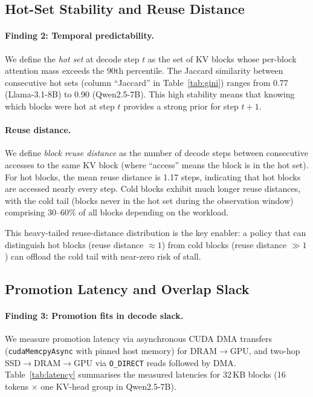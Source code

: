 \documentclass[acmsmall,nonacm,screen]{acmart}
\begin{document}
\subsection{Hot-Set Stability and Reuse Distance}\label{sec:meas:reuse}

\paragraph{Finding 2: Temporal predictability.}
We define the \emph{hot set} at decode step $t$ as the set of KV blocks
whose per-block attention mass exceeds the 90th percentile.  The Jaccard
similarity between consecutive hot sets (column ``Jaccard'' in
Table~\ref{tab:gini}) ranges from 0.77 (Llama-3.1-8B) to 0.90 (Qwen2.5-7B).
This high stability means that knowing which blocks were hot at step $t$
provides a strong prior for step $t{+}1$.

\paragraph{Reuse distance.}
We define \emph{block reuse distance} as the number of decode steps between
consecutive accesses to the same KV block (where ``access'' means the block
is in the hot set).  For hot blocks, the mean reuse distance is 1.17 steps,
indicating that hot blocks are accessed nearly every step.  Cold blocks
exhibit much longer reuse distances, with the cold tail (blocks never in the
hot set during the observation window) comprising 30--60\% of all blocks
depending on the workload.

This heavy-tailed reuse-distance distribution is the key enabler: a policy
that can distinguish hot blocks (reuse distance $\approx 1$) from cold
blocks (reuse distance $\gg 1$) can offload the cold tail with near-zero
risk of stall.

\subsection{Promotion Latency and Overlap Slack}\label{sec:meas:slack}

\paragraph{Finding 3: Promotion fits in decode slack.}
We measure promotion latency via asynchronous CUDA DMA transfers
(\texttt{cudaMemcpyAsync} with pinned host memory) for DRAM$\to$GPU, and
two-hop SSD$\to$DRAM$\to$GPU via \texttt{O\_DIRECT} reads followed by DMA.
Table~\ref{tab:latency} summarises the measured latencies for 32\,KB blocks
(16 tokens $\times$ one KV-head group in Qwen2.5-7B).
\end{document}
